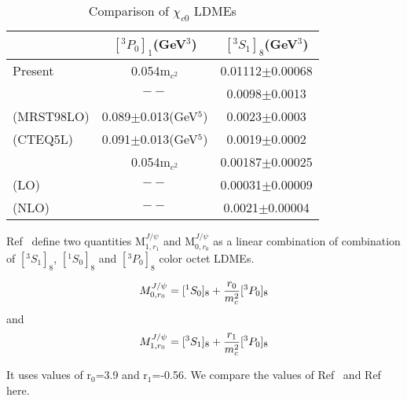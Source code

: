 \documentclass[aps,prc,preprint,superscriptaddress,showpacs,showkeys,amsmath]{revtex4-1}
\begin{document}
\begin{enumerate}
{\begin{table}[h]
\caption{Comparison of $\chi_{c0}$ LDMEs}
\begin{tabular}{|l|c|c|}
\hline            
                             &$[^3P_0]_{1}$(GeV$^3$)                     &$[^3S_1]_{8}$(GeV$^3$)      \\        
\hline
Present                      &0.054m$_{c^2}$                              &0.01112$\pm$0.00068\\
\cite{Cho:1995vh}            &$--$                                      &0.0098$\pm$0.0013   \\
\cite{Braaten:1999qk}(MRST98LO)&0.089$\pm$0.013(GeV$^{5}$)               &0.0023$\pm$0.0003    \\
\cite{Braaten:1999qk}(CTEQ5L)  &0.091$\pm$0.013(GeV$^{5}$)               &0.0019$\pm$0.0002     \\
\cite{Sharma:2012dy}           &0.054m$_{c^2}$                            &0.00187$\pm$0.00025     \\
\cite{Jia:2014jfa}(LO)         &$--$                                     &0.00031$\pm$0.00009   \\ 
\cite{Jia:2014jfa}(NLO)         &$--$                                    &0.0021$\pm$0.00004  \\ 
\hline
\end{tabular}
\label{table:LDMEChic0}
\end{table}




}
\end{enumerate}

Ref~\cite{Ma:2010jj} define two quantities M$^{J/\psi}_{1,r_{1}}$  and  M$^{J/\psi}_{0,r_{0}}$
as a linear combination of combination of $[^3S_1]_{8}$, $[^1S_0]_{8}$ and $[^3P_0]_{8}$
color octet LDMEs. 
  
\begin{equation}
M^{J/\psi}_{0,r_{0}} = [^1S_0]_{8}  + \frac{r_{0}}{m_{c}^{2}}[^3P_0]_{8}\\ \nonumber
\end{equation}
and
\begin{equation}
M^{J/\psi}_{1,r_{0}} = [^3S_1]_{8}  + \frac{r_{1}}{m_{c}^{2}}[^3P_0]_{8}\\ \nonumber
\end{equation}

It uses values of r$_{0}$=3.9 and r$_{1}$=-0.56. We compare the values of Ref~\cite{Butenschoen:2010rq}
and Ref~\cite{Ma:2010jj} here.
\end{document}

